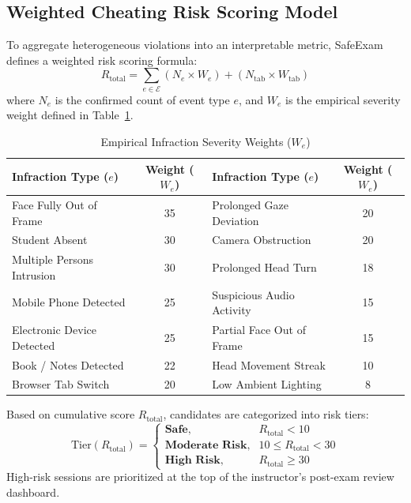 \documentclass[conference]{IEEEtran}
\begin{document}
\subsection{Weighted Cheating Risk Scoring Model}
To aggregate heterogeneous violations into an interpretable metric, SafeExam defines a weighted risk scoring formula:
\begin{equation}
R_{\text{total}} = \sum_{e \in \mathcal{E}} \left( N_e \times W_e \right) + \left( N_{\text{tab}} \times W_{\text{tab}} \right)
\label{eq:risk}
\end{equation}
where $N_e$ is the confirmed count of event type $e$, and $W_e$ is the empirical severity weight defined in Table~\ref{tab:weights}.

\begin{table}[h]
\centering
\caption{Empirical Infraction Severity Weights ($W_e$)}
\label{tab:weights}
\begin{tabular}{lc|lc}
\toprule
\textbf{Infraction Type ($e$)} & \textbf{Weight ($W_e$)} & \textbf{Infraction Type ($e$)} & \textbf{Weight ($W_e$)} \\
\midrule
Face Fully Out of Frame & 35 & Prolonged Gaze Deviation & 20 \\
Student Absent & 30 & Camera Obstruction & 20 \\
Multiple Persons Intrusion & 30 & Prolonged Head Turn & 18 \\
Mobile Phone Detected & 25 & Suspicious Audio Activity & 15 \\
Electronic Device Detected & 25 & Partial Face Out of Frame & 15 \\
Book / Notes Detected & 22 & Head Movement Streak & 10 \\
Browser Tab Switch & 20 & Low Ambient Lighting & 8 \\
\bottomrule
\end{tabular}
\end{table}

Based on cumulative score $R_{\text{total}}$, candidates are categorized into risk tiers:
\begin{equation}
\text{Tier}(R_{\text{total}}) = 
\begin{cases} 
\textbf{Safe}, & R_{\text{total}} < 10 \\
\textbf{Moderate Risk}, & 10 \le R_{\text{total}} < 30 \\
\textbf{High Risk}, & R_{\text{total}} \ge 30 
\end{cases}
\end{equation}
High-risk sessions are prioritized at the top of the instructor's post-exam review dashboard.
\end{document}
